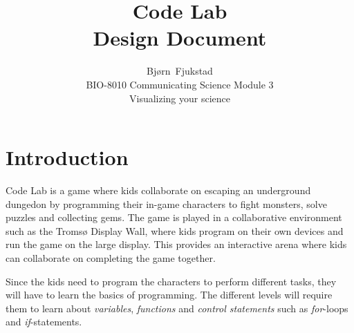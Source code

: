 \documentclass[12pt,journal,compsoc]{IEEEtran}
\begin{document}
\title{Code Lab \\ Design Document}

\author{Bjørn~Fjukstad \\ BIO-8010 Communicating Science Module 3\\ Visualizing
your science} 

\maketitle
\vspace{-15mm}

\section{Introduction} 
Code Lab is a game where kids collaborate on escaping an underground dungedon by
programming their in-game characters to fight monsters, solve puzzles and
collecting gems. The game is played in a collaborative environment such as the
Tromsø Display Wall\cite{anshus2013nineyears}, where kids program on their own
devices and run the game on the large display. This provides an interactive
arena where kids can collaborate on completing the game together.

Since the kids need to program the characters to perform different tasks, they
will have to learn the basics of programming. The different levels will require
them to learn about \emph{variables}, \emph{functions} and \emph{control
statements} such as \emph{for}-loops and \emph{if}-statements. 


{}

\end{document}
